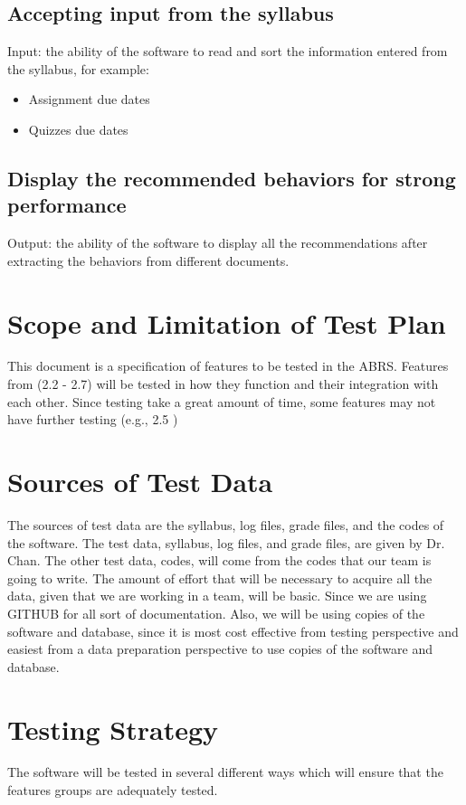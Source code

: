 \documentclass[12pt]{article}
\begin{document}
\subsection{Accepting input from the syllabus}
Input: the ability of the software to read and sort the information entered from the syllabus, for example:  
\begin{itemize}
	\item Assignment due dates
	\item Quizzes due dates
\end{itemize}

\subsection{Display the recommended behaviors for strong performance }
Output:  the ability of the software to display all the recommendations after extracting the behaviors from different documents. 


\section{Scope and Limitation of Test Plan}
This document is a specification of features to be tested in the ABRS. Features from (2.2 - 2.7) will be tested in how they function and their integration with each other. Since testing take a great amount of time, some features may not have further testing (e.g., 2.5 )

\section{Sources of Test Data}
The sources of test data are the syllabus, log files, grade files, and the codes of the software. The test data, syllabus, log files, and grade files, are given by Dr. Chan. The other test data, codes, will come from  the codes that our team is going to write. The amount  of effort that will be necessary to acquire all the data, given that we are working in a team, will be  basic. Since we are using GITHUB for all sort of documentation. Also, we will be using copies of the software and database, since it is most cost effective from testing perspective and easiest from a data preparation perspective to use copies of the software and database. 
\section{Testing Strategy}
The software will be tested in several different ways which will ensure that the features groups are adequately tested. 
\end{document}
